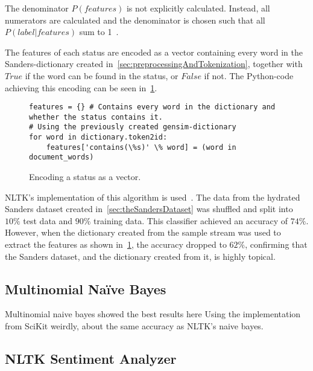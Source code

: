The denominator $P(features)$ is not explicitly calculated.
Instead, all numerators are calculated and the denominator is chosen such that all $P(label|features)$ sum to 1~\cite{nltkDocs}.

The features of each status are encoded as a vector containing every word in the Sanders-dictionary created in~\ref{sec:preprocessingAndTokenization},
together with $True$ if the word can be found in the status, or $False$ if not.
The Python-code achieving this encoding can be seen in~\ref{code:extract_features}.

\begin{figure}
    \caption{Encoding a status as a vector.}
    \label{code:extract_features}
    \begin{verbatim}
features = {} # Contains every word in the dictionary and whether the status contains it.
# Using the previously created gensim-dictionary
for word in dictionary.token2id:
    features['contains(\%s)' \% word] = (word in document_words)
    \end{verbatim}
\end{figure}

NLTK's implementation of this algorithm is used~\cite{nltkDocs}.
The data from the hydrated Sanders dataset created in~\ref{sec:theSandersDataset} was shuffled and split into $10\%$ test data and $90\%$ training data.
This classifier achieved an accuracy of $74\%$.
However, when the dictionary created from the sample stream was used to extract the features as shown in~\ref{code:extract_features},
the accuracy dropped to $62\%$, confirming that the Sanders dataset, and the dictionary created from it, is highly topical.


\subsection{Multinomial Na\"{i}ve Bayes}
\label{subsec:multinomialnaivebayes}

Multinomial naive bayes showed the best results here \cite{Go2009}
Using the implementation from SciKit
weirdly, about the same accuracy as NLTK's naive bayes.

\subsection{NLTK Sentiment Analyzer}
\label{subsec:nltksentimentanalyzer}

